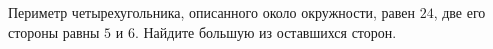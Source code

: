 \begin{ex}
	\begin{condition}
		Периметр четырехугольника, описанного около окружности, равен \( 24 \), две его стороны равны \( 5  \) и \( 6 \). Найдите большую из оставшихся сторон.
	\end{condition}
\end{ex}